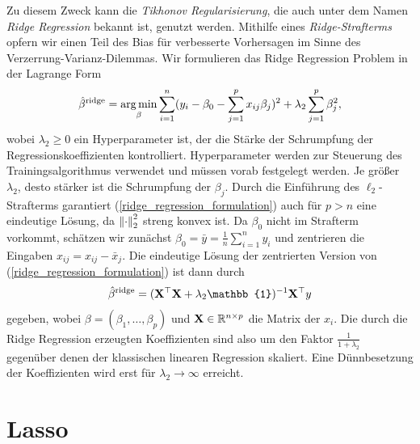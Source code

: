 Zu diesem Zweck kann die \textit{Tikhonov Regularisierung}, die auch unter dem Namen \textit{Ridge Regression} bekannt ist, genutzt werden. Mithilfe eines \textit{Ridge-Strafterms} opfern wir einen Teil des Bias für verbesserte Vorhersagen im Sinne des Verzerrung-Varianz-Dilemmas. Wir formulieren das Ridge Regression Problem in der Lagrange Form
\begin{align}
\label{ridge_regression_formulation}
\hat{\beta}^{\text{ridge}} = \operatorname*{arg\,min}_{\beta} \sum_{i=1}^{n}(y_i - \beta_0 - \sum_{j=1}^p x_{ij}\beta_j)^2 + \lambda_2\sum_{j=1}^p \beta_j^2,
\end{align}
wobei $\lambda_2 \geq 0$ ein Hyperparameter ist, der die Stärke der Schrumpfung der Regressionskoeffizienten kontrolliert. Hyperparameter werden zur Steuerung des Trainingsalgorithmus verwendet und müssen vorab festgelegt werden. Je größer $\lambda_2$, desto stärker ist die Schrumpfung der $\beta_j$. Durch die Einführung des $\ell_2$-Strafterms garantiert (\ref{ridge_regression_formulation}) auch für $p > n$ eine eindeutige Lösung, da $\left\lVert \cdot \right\rVert_{2}^{2}$ streng konvex ist. Da $\beta_0$ nicht im Strafterm vorkommt, schätzen wir zunächst $\beta_0 = \bar{y} = \frac{1}{n}\sum_{i=1}^{n} y_i$ und zentrieren die Eingaben $x_{ij} = x_{ij} - \bar{x}_j$. Die eindeutige Lösung der zentrierten Version von (\ref{ridge_regression_formulation}) ist dann durch
\begin{align}
\hat{\beta}^{\text{ridge}}  = (\mat X^{\top} \mat X + \lambda_2\mat{\mathbb{1}})^{-1}\mat{X}^{\top}y
\end{align}
gegeben, wobei $\beta = (\beta_1, \ldots, \beta_p)$ und $\mathbf{X} \in \mathbb{R}^{n \times p}$ die Matrix der $x_i$. Die durch die Ridge Regression erzeugten Koeffizienten sind also um den Faktor $\frac{1}{1+\lambda_2}$ gegenüber denen der klassischen linearen Regression skaliert. Eine Dünnbesetzung der Koeffizienten wird erst für $\lambda_2 \to \infty$ erreicht.




\section{Lasso}
\label{lasso}


